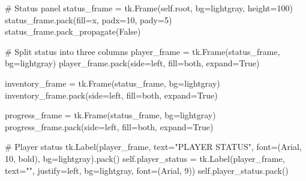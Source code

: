 \documentclass[
  letterpaper,
  DIV=11,
  numbers=noendperiod,
  oneside]{scrreprt}
\newenvironment{Shaded}{}{}
\newcommand{\CommentTok}[1]{\textcolor[rgb]{0.42,0.45,0.49}{#1}}
\newcommand{\DecValTok}[1]{\textcolor[rgb]{0.00,0.36,0.77}{#1}}
\newcommand{\NormalTok}[1]{\textcolor[rgb]{0.14,0.16,0.18}{#1}}
\newcommand{\OperatorTok}[1]{\textcolor[rgb]{0.14,0.16,0.18}{#1}}
\newcommand{\StringTok}[1]{\textcolor[rgb]{0.01,0.18,0.38}{#1}}
\newcommand{\VariableTok}[1]{\textcolor[rgb]{0.89,0.38,0.04}{#1}}
\begin{document}
\begin{Shaded}
\begin{Highlighting}[]
        \CommentTok{\# Status panel}
\NormalTok{        status\_frame }\OperatorTok{=}\NormalTok{ tk.Frame(}\VariableTok{self}\NormalTok{.root, bg}\OperatorTok{=}\StringTok{\textquotesingle{}lightgray\textquotesingle{}}\NormalTok{, height}\OperatorTok{=}\DecValTok{100}\NormalTok{)}
\NormalTok{        status\_frame.pack(fill}\OperatorTok{=}\StringTok{\textquotesingle{}x\textquotesingle{}}\NormalTok{, padx}\OperatorTok{=}\DecValTok{10}\NormalTok{, pady}\OperatorTok{=}\DecValTok{5}\NormalTok{)}
\NormalTok{        status\_frame.pack\_propagate(}\VariableTok{False}\NormalTok{)}
        
        \CommentTok{\# Split status into three columns}
\NormalTok{        player\_frame }\OperatorTok{=}\NormalTok{ tk.Frame(status\_frame, bg}\OperatorTok{=}\StringTok{\textquotesingle{}lightgray\textquotesingle{}}\NormalTok{)}
\NormalTok{        player\_frame.pack(side}\OperatorTok{=}\StringTok{\textquotesingle{}left\textquotesingle{}}\NormalTok{, fill}\OperatorTok{=}\StringTok{\textquotesingle{}both\textquotesingle{}}\NormalTok{, expand}\OperatorTok{=}\VariableTok{True}\NormalTok{)}
        
\NormalTok{        inventory\_frame }\OperatorTok{=}\NormalTok{ tk.Frame(status\_frame, bg}\OperatorTok{=}\StringTok{\textquotesingle{}lightgray\textquotesingle{}}\NormalTok{)}
\NormalTok{        inventory\_frame.pack(side}\OperatorTok{=}\StringTok{\textquotesingle{}left\textquotesingle{}}\NormalTok{, fill}\OperatorTok{=}\StringTok{\textquotesingle{}both\textquotesingle{}}\NormalTok{, expand}\OperatorTok{=}\VariableTok{True}\NormalTok{)}
        
\NormalTok{        progress\_frame }\OperatorTok{=}\NormalTok{ tk.Frame(status\_frame, bg}\OperatorTok{=}\StringTok{\textquotesingle{}lightgray\textquotesingle{}}\NormalTok{)}
\NormalTok{        progress\_frame.pack(side}\OperatorTok{=}\StringTok{\textquotesingle{}left\textquotesingle{}}\NormalTok{, fill}\OperatorTok{=}\StringTok{\textquotesingle{}both\textquotesingle{}}\NormalTok{, expand}\OperatorTok{=}\VariableTok{True}\NormalTok{)}
        
        \CommentTok{\# Player status}
\NormalTok{        tk.Label(player\_frame, text}\OperatorTok{=}\StringTok{"PLAYER STATUS"}\NormalTok{, font}\OperatorTok{=}\NormalTok{(}\StringTok{\textquotesingle{}Arial\textquotesingle{}}\NormalTok{, }\DecValTok{10}\NormalTok{, }\StringTok{\textquotesingle{}bold\textquotesingle{}}\NormalTok{), }
\NormalTok{                bg}\OperatorTok{=}\StringTok{\textquotesingle{}lightgray\textquotesingle{}}\NormalTok{).pack()}
        \VariableTok{self}\NormalTok{.player\_status }\OperatorTok{=}\NormalTok{ tk.Label(player\_frame, text}\OperatorTok{=}\StringTok{""}\NormalTok{, justify}\OperatorTok{=}\StringTok{\textquotesingle{}left\textquotesingle{}}\NormalTok{, }
\NormalTok{                                     bg}\OperatorTok{=}\StringTok{\textquotesingle{}lightgray\textquotesingle{}}\NormalTok{, font}\OperatorTok{=}\NormalTok{(}\StringTok{\textquotesingle{}Arial\textquotesingle{}}\NormalTok{, }\DecValTok{9}\NormalTok{))}
        \VariableTok{self}\NormalTok{.player\_status.pack()}
        

\end{Highlighting}
\end{Shaded}
\end{document}
